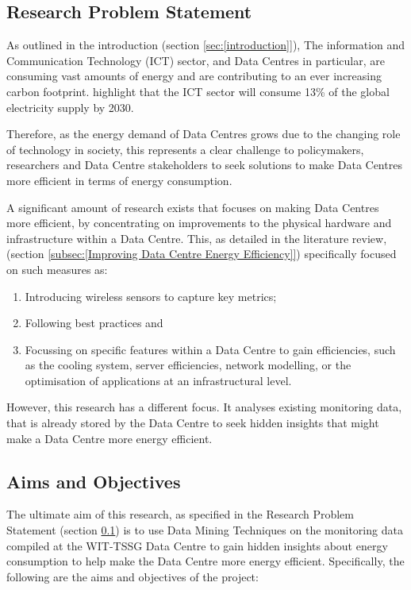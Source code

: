 \documentclass[12pt]{scrartcl}
\begin{document}
\subsection{Research Problem Statement}
\label{subsec:[Research Problem Statement]}
As outlined in the introduction (section \ref{sec:[introduction]}), The information and Communication Technology (ICT) sector, and Data Centres in particular, are consuming vast amounts of energy and are contributing to an ever increasing carbon footprint.  \citet{edsbas.13818AC20170101} highlight that the ICT sector will consume 13\% of the global electricity supply by 2030. 

Therefore, as the energy demand of Data Centres grows due to the changing role of technology in society, this represents a clear challenge to policymakers, researchers and Data Centre stakeholders to seek solutions to make Data Centres more efficient in terms of energy consumption. 

A significant amount of research exists that focuses on making Data Centres more efficient, by concentrating on improvements to the physical hardware and infrastructure within a Data Centre. This, as detailed in the literature review, (section \ref{subsec:[Improving Data Centre Energy Efficiency]}) specifically focused on such measures as: 

\begin{enumerate}
	\item Introducing wireless sensors to capture key metrics;
	\item Following best practices and 
	\item Focussing on specific features within a Data Centre to gain efficiencies, such as the cooling system, server efficiencies, network modelling, or the optimisation of applications at an infrastructural level. 
\end{enumerate}

However, this research has a different focus. It analyses existing monitoring data, that is already stored by the Data Centre to seek hidden insights that might make a Data Centre more energy efficient. 

\subsection{Aims and Objectives}
\label{subsec:[Aims and Objective]}

The ultimate aim of this research, as specified in the Research Problem Statement (section \ref{subsec:[Research Problem Statement]}) is to use Data Mining Techniques on the monitoring data compiled at the WIT-TSSG Data Centre to gain hidden insights about energy consumption to help make the Data Centre more energy efficient. 
Specifically, the following are the aims and objectives of the project:
\end{document}
